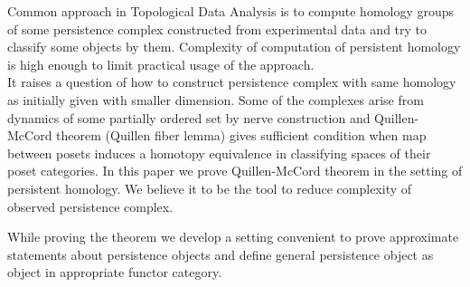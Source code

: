 Common approach in Topological Data Analysis is to compute homology groups of some persistence complex constructed from experimental data and try to classify some objects by them. Complexity of computation of persistent homology is high enough to limit practical usage of the approach.\\

It raises a question of how to construct persistence complex with same homology as initially given with smaller dimension. Some of the complexes arise from dynamics of some partially ordered set by nerve construction and Quillen-McCord theorem (Quillen fiber lemma) gives sufficient condition when map between posets induces a homotopy equivalence in classifying spaces of their poset categories. In this paper we prove Quillen-McCord theorem in the setting of persistent homology. We believe it to be the tool to reduce complexity of observed persistence complex.

While proving the theorem we develop a setting convenient to prove approximate statements about persistence objects and define general persistence object as object in appropriate functor category.
